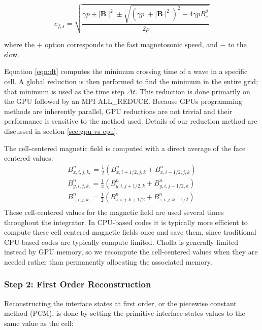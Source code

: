 \documentclass[modern]{aastex631}
\begin{document}
\begin{equation}
    c_{f,s} = \sqrt{\frac
    {\gamma p + \mid \boldsymbol{B} \mid^2 \pm \sqrt{\left( \gamma p \;+ \mid \boldsymbol{B} \mid^2 \right)^2 - 4\gamma p B_x^2 } }
    {2\rho}}
\end{equation}

\noindent where the $+$ option corresponds to the fast magnetosonic speed, and $-$ to the slow.

Equation \ref{eqn:dt} computes the minimum crossing time of a wave in a specific cell. A global reduction is then performed to find the minimum in the entire grid; that minimum is used as the time step $\Delta t$. This reduction is done primarily on the GPU followed by an MPI ALL\_REDUCE. Because GPUs programming methods are inherently parallel, GPU reductions are not trivial and their performance is sensitive to the method used. Details of our reduction method are discussed in section \ref{sec:gpu-vs-cpu}.

The cell-centered magnetic field is computed with a direct average of the face centered values:
\begin{equation}
    \begin{aligned}
        B^n_{x,i,j,k,} = \frac{1}{2} \left( B^n_{x,i+1/2,j,k} + B^n_{x,i-1/2,j,k} \right) \\
        B^n_{y,i,j,k,} = \frac{1}{2} \left( B^n_{y,i,j+1/2,k} + B^n_{y,i,j-1/2,k} \right) \\
        B^n_{z,i,j,k,} = \frac{1}{2} \left( B^n_{z,i,j,k+1/2} + B^n_{z,i,j,k-1/2} \right) \\
    \end{aligned}
\end{equation}
These cell-centered values for the magnetic field are used several times throughout the integrator. In CPU-based codes it is typically more efficient to compute these cell centered magnetic fields once and save them, since traditional CPU-based codes are typically compute limited. Cholla is generally limited instead by GPU memory, so we recompute the cell-centered values when they are needed rather than permanently allocating the associated memory.



\subsubsection{Step 2: First Order Reconstruction}
\label{vlct:first-order-reconstruction}

Reconstructing the interface states at first order, or the piecewise constant method (PCM), is done by setting the primitive interface states values to the same value as the cell:
\end{document}
